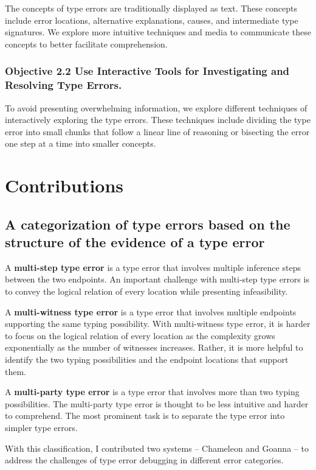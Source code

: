 The concepts of type errors are traditionally displayed as text. These concepts include error locations, alternative explanations, causes, and intermediate type signatures. We explore more intuitive techniques and media to communicate these concepts to better facilitate comprehension.

\subsubsection{Objective 2.2 Use Interactive Tools for Investigating and Resolving Type Errors.}

To avoid presenting overwhelming information, we explore different techniques of interactively exploring the type errors. These techniques include dividing the type error into small chunks that follow a linear line of reasoning or bisecting the error one step at a time into smaller concepts.


\section{Contributions}

\subsection{A categorization of type errors based on the structure of the evidence of a type error}

A \textbf{multi-step type error} is a type error that involves multiple inference steps between the two endpoints. An important challenge with multi-step type errors is to convey the logical relation of every location while presenting infeasibility. 

A \textbf{multi-witness type error} is a type error that involves multiple endpoints supporting the same typing possibility. With multi-witness type error, it is harder to focus on the logical relation of every location as the complexity grows exponentially as the number of witnesses increases. Rather, it is more helpful to identify the two typing possibilities and the endpoint locations that support them.

A \textbf{multi-party type error} is a type error that involves more than two typing possibilities. The multi-party type error is thought to be less intuitive and harder to comprehend. The most prominent task is to separate the type error into simpler type errors. 


With this classification, I contributed two systems -- Chameleon and Goanna -- to address the challenges of type error debugging in different error categories.

